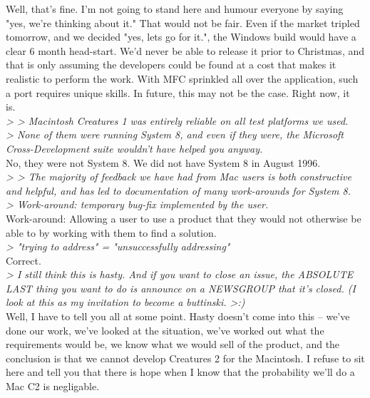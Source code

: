 \documentclass[11pt,twoside,a4paper]{article}
\begin{document}
\begin{multicols*}{2}
Well, that's fine. I'm not going to stand here and humour everyone by saying "yes, we're thinking about it." That would not be fair. Even if the market tripled tomorrow, and we decided "yes, lets go for it.", the Windows build would have a clear 6 month head-start. We'd never be able to release it prior to Christmas, and that is only assuming the developers could be found at a cost that makes it realistic to perform the work. With MFC sprinkled all over the application, such a port requires unique skills. In future, this may not be the case. Right now, it is.~\\

\emph{> >  Macintosh Creatures 1 was entirely reliable on all test platforms we used.}~\\
\emph{> None of them were running System 8, and even if they were, the Microsoft Cross-Development suite wouldn't have helped you anyway.}~\\

No, they were not System 8. We did not have System 8 in August 1996.~\\

\emph{> >  The majority of feedback we have had from Mac users is both constructive and helpful, and has led to documentation of many work-arounds for System 8.}~\\
\emph{> Work-around: temporary bug-fix implemented by the user.}~\\

Work-around: Allowing a user to use a product that they would not otherwise be able to by working with them to find a solution.~\\

\emph{> "trying to address" = "unsuccessfully addressing"}~\\

Correct.~\\

\emph{> I still think this is hasty. And if you want to close an issue, the ABSOLUTE LAST thing you want to do is announce on a NEWSGROUP that it's closed. (I look at this as my invitation to become a buttinski. >:)}~\\

Well, I have to tell you all at some point. Hasty doesn't come into this -- we've done our work, we've looked at the situation, we've worked out what the requirements would be, we know what we would sell of the product, and the conclusion is that we cannot develop Creatures 2 for the Macintosh. I refuse to sit here and tell you that there is hope when I know that the probability we'll do a Mac C2 is negligable.~\\


\end{multicols*}
\end{document}
